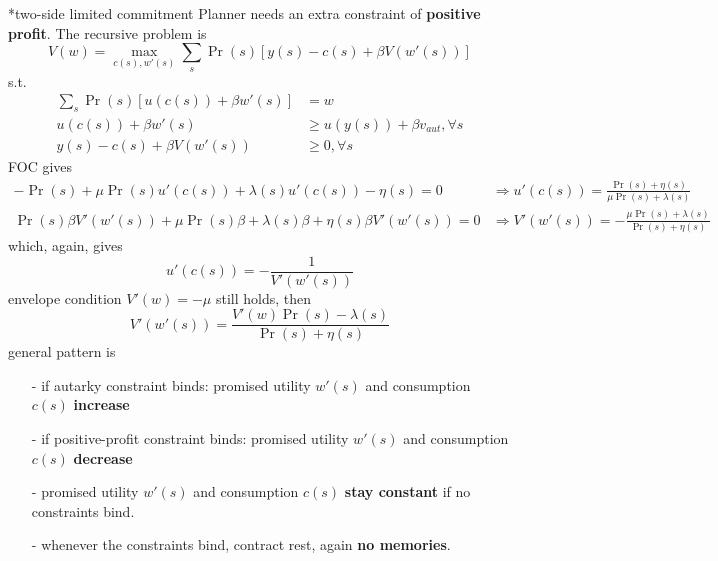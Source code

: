 \documentclass[10pt,landscape,a4paper]{article}
\makeatletter
\renewcommand{\subsubsection}{\@startsection{subsubsection}{1}{0mm}{.2ex}{.2ex}{\bfseries}}
\makeatother
\begin{document}
\begin{multicols*}{3}
\subsubsection*{two-side limited commitment}
Planner needs an extra constraint of \textbf{positive profit}. The recursive problem is 
$$
V(w) = \max_{c(s),w'(s)}\sum_s \Pr(s) \left[ y(s)-c(s) + \beta V(w'(s)) \right]
$$
s.t.
\begin{align*}
    \sum_s \Pr(s)\left[ u(c(s))+\beta w'(s) \right] &= w \\
    u(c(s)) + \beta w'(s) &\geq u(y(s))+\beta v_{aut}, \forall s \\
    y(s)-c(s) +\beta V(w'(s)) & \geq 0, \forall s
\end{align*}
FOC gives
\begin{align*}
    -\Pr(s) + \mu\Pr(s)u'(c(s)) + \lambda(s)u'(c(s)) -\eta(s)= 0 & \Rightarrow u'(c(s)) = \frac{\Pr(s)+\eta(s)}{\mu\Pr(s)+\lambda(s)} \\
    \Pr(s)\beta V'(w'(s)) + \mu\Pr(s)\beta +\lambda(s)\beta +\eta(s)\beta V'(w'(s))= 0  &\Rightarrow V'(w'(s)) = -\frac{\mu \Pr(s)+\lambda(s)}{\Pr(s)+\eta(s)}
\end{align*}
which, again, gives
{\color{myred}$$
u'(c(s)) = -\frac{1}{V'(w'(s))}
$$}
envelope condition $V'(w)=-\mu$ still holds, then 
$$
V'(w'(s)) = \frac{V'(w)\Pr(s)-\lambda(s)}{\Pr(s)+\eta(s)}
$$
general pattern is
\begin{itemize}
    \item[-] if autarky constraint binds: promised utility $w'(s)$ and consumption $c(s)$ \textbf{increase}
    \item[-] if positive-profit constraint binds: promised utility $w'(s)$ and consumption $c(s)$ \textbf{decrease}
    \item[-] promised utility $w'(s)$ and consumption $c(s)$ \textbf{stay constant} if no constraints bind.
    \item[-] whenever the constraints bind, contract rest, again \textbf{no memories}.
\end{itemize}


\end{multicols*}
\end{document}
